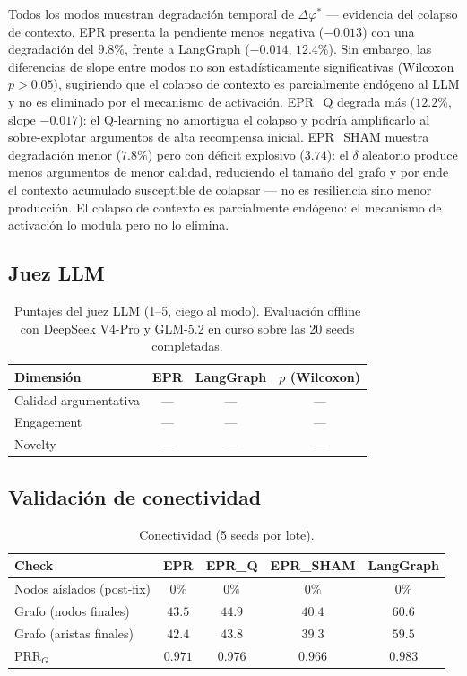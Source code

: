 \documentclass{llncs}
\begin{document}
Todos los modos muestran degradaci\'on temporal de $\Delta\varphi^*$ ---
evidencia del colapso de contexto. EPR presenta la pendiente menos
negativa ($-0.013$) con una degradaci\'on del $9.8\%$, frente a
LangGraph ($-0.014$, $12.4\%$). Sin embargo, las diferencias de slope
entre modos no son estad\'isticamente significativas (Wilcoxon
$p>0.05$), sugiriendo que el colapso de contexto es parcialmente
end\'ogeno al LLM y no es eliminado por el mecanismo de activaci\'on.
EPR\_Q degrada m\'as ($12.2\%$, slope $-0.017$): el Q-learning no
amortigua el colapso y podr\'ia amplificarlo al sobre-explotar
argumentos de alta recompensa inicial. EPR\_SHAM muestra degradaci\'on
menor ($7.8\%$) pero con d\'eficit explosivo ($3.74$): el $\delta$
aleatorio produce menos argumentos de menor calidad, reduciendo el
tama\~no del grafo y por ende el contexto acumulado susceptible de
colapsar --- no es resiliencia sino menor producci\'on. El colapso de
contexto es parcialmente end\'ogeno: el mecanismo de activaci\'on lo
modula pero no lo elimina.

\subsection{Juez LLM}

\begin{table}[H]
\caption{Puntajes del juez LLM (1--5, ciego al modo).
Evaluaci\'on offline con DeepSeek V4-Pro y GLM-5.2 en curso sobre las
20 seeds completadas.}
\label{tab:judge}
\centering\small
\begin{tabular}{|l|c|c|c|}
\hline
\textbf{Dimensi\'on} & \textbf{EPR} & \textbf{LangGraph} & $p$ (Wilcoxon) \\
\hline
Calidad argumentativa & --- & --- & --- \\
Engagement            & --- & --- & --- \\
Novelty               & --- & --- & --- \\
\hline
\end{tabular}
\end{table}

\subsection{Validaci\'on de conectividad}

\begin{table}[H]
\caption{Conectividad (5 seeds por lote).}
\label{tab:conn}
\centering\small
\begin{tabular}{|l|c|c|c|c|}
\hline
\textbf{Check} & \textbf{EPR} & \textbf{EPR\_Q} & \textbf{EPR\_SHAM} & \textbf{LangGraph} \\
\hline
Nodos aislados (post-fix)    & $0\%$ & $0\%$ & $0\%$ & $0\%$ \\
Grafo (nodos finales)        & $43.5$ & $44.9$ & $40.4$ & $60.6$ \\
Grafo (aristas finales)      & $42.4$ & $43.8$ & $39.3$ & $59.5$ \\
PRR$_G$                      & $0.971$ & $0.976$ & $0.966$ & $0.983$ \\
\hline
\end{tabular}
\end{table}
\end{document}
